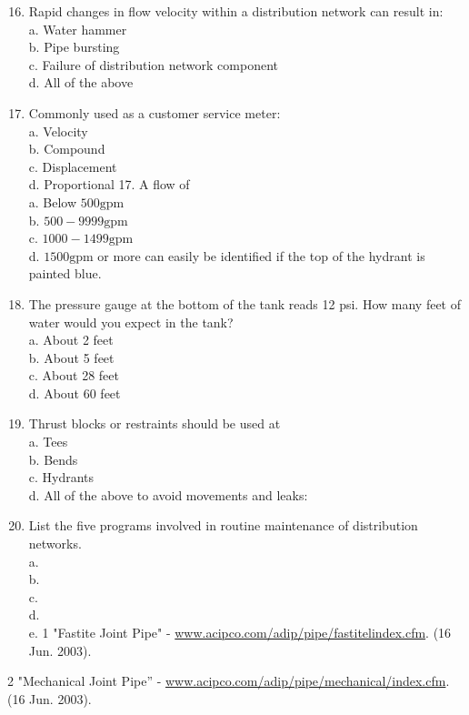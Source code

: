\documentclass[10pt]{article}
\begin{document}
\begin{enumerate}
  \setcounter{enumi}{15}
  \item Rapid changes in flow velocity within a distribution network can result in:\\
a. Water hammer\\
b. Pipe bursting\\
c. Failure of distribution network component\\
d. All of the above

  \item Commonly used as a customer service meter:\\
a. Velocity\\
b. Compound\\
c. Displacement\\
d. Proportional 17. A flow of\\
a. Below $500 \mathrm{gpm}$\\
b. $500-9999 \mathrm{gpm}$\\
c. $1000-1499 \mathrm{gpm}$\\
d. $1500 \mathrm{gpm}$ or more can easily be identified if the top of the hydrant is painted blue.

  \item The pressure gauge at the bottom of the tank reads 12 psi. How many feet of water would you expect in the tank?\\
a. About 2 feet\\
b. About 5 feet\\
c. About 28 feet\\
d. About 60 feet

  \item Thrust blocks or restraints should be used at\\
a. Tees\\
b. Bends\\
c. Hydrants\\
d. All of the above to avoid movements and leaks:

  \item List the five programs involved in routine maintenance of distribution networks.\\
a.\\
b.\\
c.\\
d.\\
e. 1 "Fastite Joint Pipe" - \href{http://www.acipco.com/adip/pipe/fastitelindex.cfm}{www.acipco.com/adip/pipe/fastitelindex.cfm}. (16 Jun. 2003).

\end{enumerate}
2 "Mechanical Joint Pipe” - \href{http://www.acipco.com/adip/pipe/mechanical/index.cfm}{www.acipco.com/adip/pipe/mechanical/index.cfm}. (16 Jun. 2003).
\end{document}
